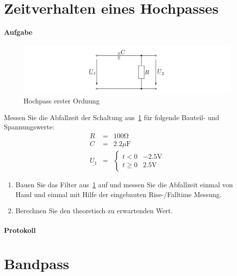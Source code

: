 \documentclass[10pt]{scrreprt}
\begin{document}
    \section{Zeitverhalten eines Hochpasses}
    \paragraph{Aufgabe}
    \begin{center}
        \begin{figure}[H]
            \includegraphics[width=\textwidth]{abb8.png}
            \caption{Hochpass erster Ordnung}
            \label{fig:abb8}
        \end{figure}
    \end{center}
    Messen Sie die Abfallzeit der Schaltung aus~\ref{fig:abb8} für folgende Bauteil- und
    Spannungswerte:
    \begin{eqnarray*}
        R &=& 100\si{\ohm}\\
        C &=& 2.2\si{\mu \farad}\\
            \underline{U_1} &=&
            \begin{cases}
                t < 0& -2.5\si{\volt}\\
                t \geq 0& 2.5\si{\volt}
            \end{cases}
    \end{eqnarray*}
    \begin{enumerate}
        \item Bauen Sie das Filter aus~\ref{fig:abb8} auf und messen Sie die Abfallzeit einmal von Hand
            und einmal mit Hilfe der eingebauten Rise-/Falltime Messung.
        \item Berechnen Sie den theoretisch zu erwartenden Wert.
    \end{enumerate}

    \paragraph{Protokoll}

    \section{Bandpass}
\end{document}
